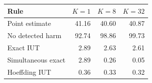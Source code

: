 \begin{tabular}{lrrr}
\toprule
Rule & $K=1$ & $K=8$ & $K=32$ \\
\midrule
Point estimate & 41.16 & 40.60 & 40.87 \\
No detected harm & 92.74 & 98.86 & 99.73 \\
Exact IUT & 2.89 & 2.63 & 2.61 \\
Simultaneous exact & 2.89 & 0.26 & 0.05 \\
Hoeffding IUT & 0.36 & 0.33 & 0.32 \\
\bottomrule
\end{tabular}
